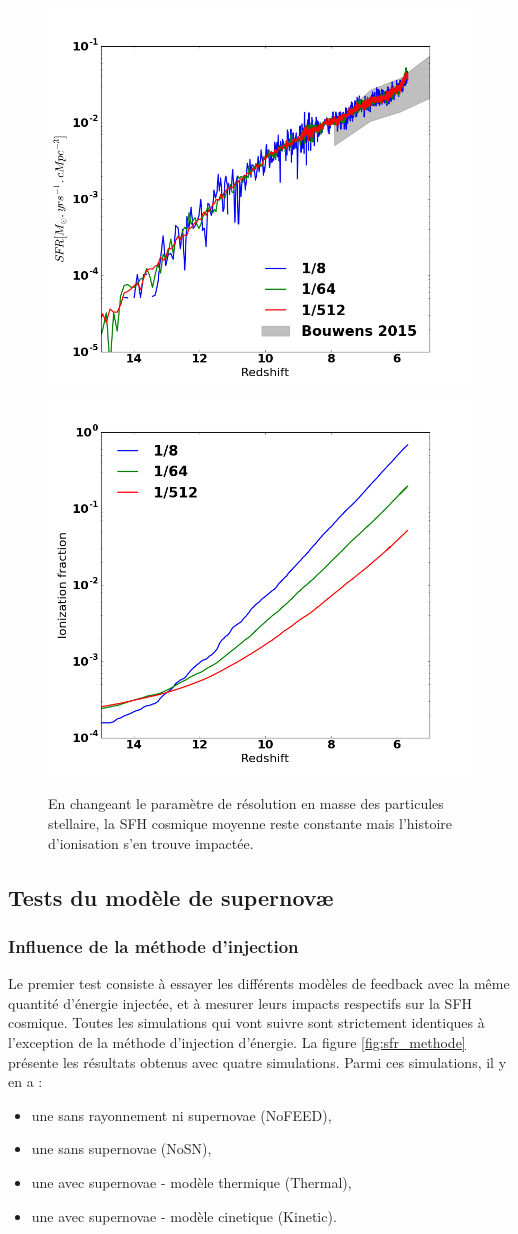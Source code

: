 \begin{figure}
        \includegraphics[width=.5\textwidth]{img/02/Mstar_SFH.png} 
        \includegraphics[width=.5\textwidth]{img/02/Mstar_xion.png} 
        \caption[Masses des étoiles]{En changeant le paramètre de résolution en masse des particules stellaire, la \ac{SFH} cosmique moyenne reste constante mais l'histoire d'ionisation s'en trouve impactée.
 		\label{fig:mstar}}
\end{figure}

\clearpage
\subsection{Tests du modèle de supernovæ}
\label{sec:testsncosmo}

\subsubsection{Influence de la méthode d'injection}
\label{sec:snmethod}

Le premier test consiste à essayer les différents modèles de feedback avec la même quantité d'énergie injectée, et à mesurer leurs impacts respectifs sur la \ac{SFH} cosmique.
Toutes les simulations qui vont suivre sont strictement identiques à l'exception de la méthode d'injection d'énergie.
La figure \ref{fig:sfr_methode} présente les résultats obtenus avec quatre simulations.
Parmi ces simulations, il y en a :
\begin{itemize}
\item une sans rayonnement ni supernovae (NoFEED),
\item une sans supernovae (NoSN),
\item une avec supernovae - modèle thermique (Thermal),
\item une avec supernovae - modèle cinetique (Kinetic).
\end{itemize}

